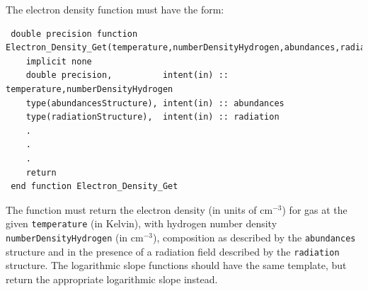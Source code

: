 The electron density function must have the form:
\begin{verbatim}
 double precision function Electron_Density_Get(temperature,numberDensityHydrogen,abundances,radiation)
    implicit none
    double precision,          intent(in) :: temperature,numberDensityHydrogen
    type(abundancesStructure), intent(in) :: abundances
    type(radiationStructure),  intent(in) :: radiation
    .
    .
    .
    return
 end function Electron_Density_Get
\end{verbatim}
The function must return the electron density (in units of cm$^{-3}$) for gas at the given {\tt temperature} (in Kelvin), with hydrogen number density {\tt numberDensityHydrogen} (in cm$^{-3}$), composition as described by the {\tt abundances} structure and in the presence of a radiation field described by the {\tt radiation} structure. The logarithmic slope functions should have the same template, but return the appropriate logarithmic slope instead.

